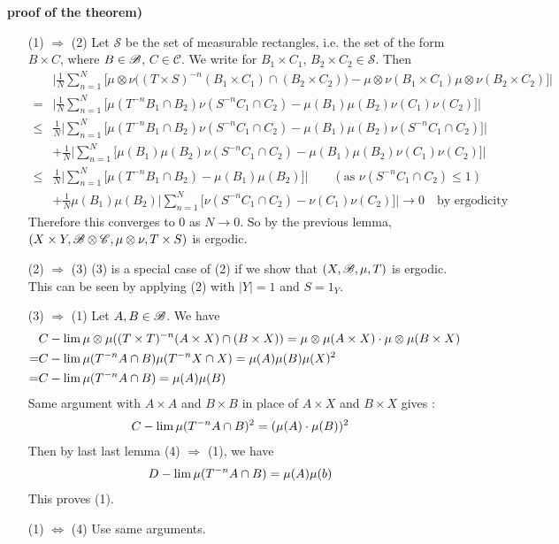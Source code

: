 \documentclass[10pt,a4paper]{report}
\newenvironment{proof}
{\begin{changemargin}{1cm}{0.5cm} 
	}%
	{\end{changemargin}
}
\begin{document}
\begin{proof}
\textbf{proof of the theorem)}
\begin{itemize}
\item[(1) $\Rightarrow$ (2)] Let $\mathscr{S}$ be the set of measurable rectangles, i.e. the set of the form $B\times C$, where $B\in \mathscr{B}$, $C\in \mathscr{C}$. We write for $B_1 \times C_1$, $B_2\times C_2 \in \mathscr{S}$. Then
\begin{align*}
& \Big| \frac{1}{N}\sum_{n=1}^N \Big[ \mu \otimes \nu \big((T\times S)^{-n}(B_1 \times C_1) \cap (B_2 \times C_2) \big) - \mu \otimes \nu (B_1 \times C_1)\mu \otimes \nu (B_2 \times C_2) \Big] \Big| \\
=& \Big| \frac{1}{N} \sum_{n=1}^N \Big[ \mu(T^{-n}B_1 \cap B_2) \nu(S^{-n}C_1 \cap C_2) - \mu(B_1) \mu(B_2) \nu(C_1) \nu(C_2) \Big] \Big| \\
\leq & \frac{1}{N} \Big| \sum_{n=1}^N \Big[ \mu(T^{-n}B_1 \cap B_2) \nu(S^{-n}C_1 \cap C_2) - \mu(B_1)\mu(B_2)\nu(S^{-n}C_1\cap C_2) \Big] \Big| \\
& + \frac{1}{N} \Big| \sum_{n=1}^N \Big[ \mu(B_1)\mu(B_2)\nu(S^{-n}C_1\cap C_2) - \mu(B_1) \mu(B_2) \nu(C_1) \nu(C_2) \Big] \Big| \\
\leq & \frac{1}{N} \Big| \sum_{n=1}^N \Big[ \mu(T^{-n}B_1 \cap B_2) - \mu(B_1)\mu(B_2)\Big] \Big| \quad\quad (\text{as } \nu(S^{-n}C_1\cap C_2) \leq 1 ) \\
& + \frac{1}{N} \mu(B_1) \mu(B_2) \Big| \sum_{n=1}^N \Big[ \nu(S^{-n}C_1 \cap C_2) - \nu(C_1)\nu(C_2) \Big] \Big| \rightarrow 0 \quad \text{by ergodicity}
\end{align*}
Therefore this converges to 0 as $N\rightarrow 0$. So by the previous lemma, $(X\times Y,\mathscr{B}\otimes \mathscr{C}, \mu\otimes \nu, T\times S)$ is ergodic.
\item[(2) $\Rightarrow$ (3)] (3) is a special case of (2) if we show that $(X,\mathscr{B}, \mu, T)$ is ergodic. This can be seen by applying (2) with $|Y|=1$ and $S = 1_{Y}$.
\item[(3) $\Rightarrow$ (1)]  Let $A,B \in \mathscr{B}$. We have
\begin{align*}
& C-\lim \mu \otimes \mu((T\times T)^{-n}(A\times X) \cap (B\times X)) = \mu \otimes \mu (A \times X) \cdot \mu \otimes \mu (B \times X) \\
=& C-\lim \mu(T^{-n}A\cap B)\mu(T^{-n}X\cap X) = \mu(A) \mu(B) \mu(X)^2 \\
=& C-\lim \mu(T^{-n}A\cap B) = \mu(A) \mu(B)
\end{align*}
Same argument with $A \times A$ and $B\times B$ in place of $A\times X$ and $B\times X$ gives :
\begin{align*}
C-\lim \mu(T^{-n}A \cap B)^2 = (\mu(A) \cdot \mu(B))^2
\end{align*}
Then by last last lemma (4) $\Rightarrow$ (1), we have
\begin{align*}
D-\lim \mu(T^{-n} A\cap B)= \mu(A) \mu(b)
\end{align*}
This proves (1).
\item[(1) $\Leftrightarrow$ (4)] Use same arguments.
\end{itemize}
\end{proof}
\s
\end{document}
